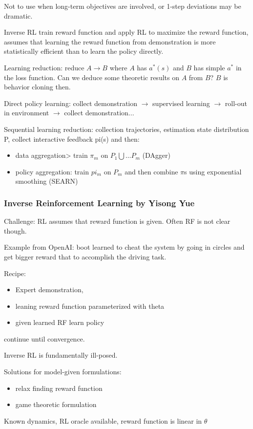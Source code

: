 \documentclass[11pt,oneside,a4paper]{scrartcl}
\begin{document}
Not to use when long-term objectives are involved, or 1-step
deviations may be dramatic.

Inverse RL train reward function and apply RL to maximize the reward
function, assumes that learning the reward function from demonstration
is more statistically efficient than to learn the policy directly.

Learning reduction: reduce $A\rightarrow B$ where $A$ has $a^*(s)$ and $B$ has simple $a^*$
in the loss function. Can we deduce some theoretic results on $A$ from
$B$? $B$ is behavior cloning then.

Direct policy learning: collect demonstration $\rightarrow$
supervised learning $\rightarrow$
roll-out in environment $\rightarrow$ collect demonstration...

Sequential learning reduction: collection trajectories, estimation
state distribution P, collect interactive feedback pi(s) and then:
\begin{itemize}
\item data aggregation> train $\pi_m$ on $P_1 \bigcup \ldots P_m$
  (DAgger)

\item policy aggregation: train $pi_m$ on $P_m$ and then combine
$\pi$s using exponential smoothing (SEARN)
\end{itemize}

\subsubsection{Inverse Reinforcement Learning by Yisong Yue}
\label{sec:inverse-reinf-learn}

Challenge: RL assumes that reward function is given. Often RF is not
clear though.

Example from OpenAI: boot learned to cheat the system by going in
circles and get bigger reward that to accomplish the driving task.

Recipe:
\begin{itemize}
\item Expert demonstration,
\item leaning reward function parameterized with theta
\item  given learned RF learn policy
\end{itemize}

continue until convergence.

Inverse RL is fundamentally ill-posed.

Solutions for model-given formulations:
\begin{itemize}
\item  relax finding reward function \cite{abbeel2004apprenticeship}

\item game theoretic formulation \cite{NIPS2007_3293}
\end{itemize}
Known dynamics, RL oracle available, reward function is linear in $\theta$
\end{document}
